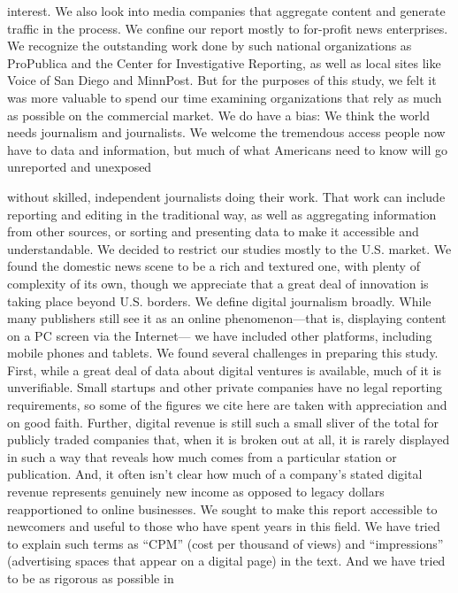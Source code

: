 interest. We also look into media companies that aggregate content and generate
traffic in the process.
We confine our report mostly to for-profit news enterprises. We recognize
the outstanding work done by such national organizations as ProPublica and the
Center for Investigative Reporting, as well as local sites like Voice of San Diego
and MinnPost. But for the purposes of this study, we felt it was more valuable
to spend our time examining organizations that rely as much as possible on the
commercial market.
We do have a bias: We think the world needs journalism and journalists. We
welcome the tremendous access people now have to data and information, but
much of what Americans need to know will go unreported and unexposed

without skilled, independent journalists doing their work. That work can include
reporting and editing in the traditional way, as well as aggregating information
from other sources, or sorting and presenting data to make it accessible
and understandable.
We decided to restrict our studies mostly to the U.S. market. We found the
domestic news scene to be a rich and textured one, with plenty of complexity
of its own, though we appreciate that a great deal of innovation is taking place
beyond U.S. borders.
We define digital journalism broadly. While many publishers still see it as an
online phenomenon—that is, displaying content on a PC screen via the Internet—
we have included other platforms, including mobile phones and tablets.
We found several challenges in preparing this study. First, while a great deal of
data about digital ventures is available, much of it is unverifiable. Small startups
and other private companies have no legal reporting requirements, so some of
the figures we cite here are taken with appreciation and on good faith. Further,
digital revenue is still such a small sliver of the total for publicly traded companies
that, when it is broken out at all, it is rarely displayed in such a way that reveals
how much comes from a particular station or publication. And, it often isn’t clear
how much of a company’s stated digital revenue represents genuinely new income
as opposed to legacy dollars reapportioned to online businesses.
We sought to make this report accessible to newcomers and useful to those
who have spent years in this field. We have tried to explain such terms as ``CPM''
(cost per thousand of views) and ``impressions'' (advertising spaces that appear
on a digital page) in the text. And we have tried to be as rigorous as possible in
